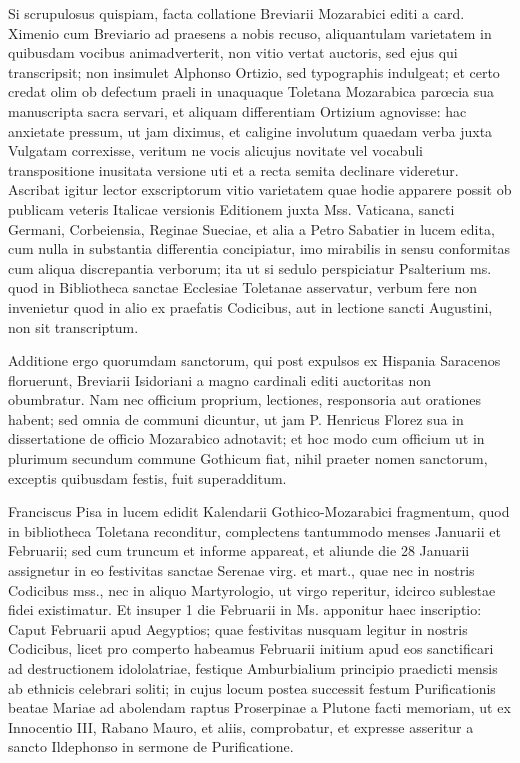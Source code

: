\documentclass[letter,11pt]{book}
\begin{document}
 Si scrupulosus quispiam, facta collatione Breviarii Mozarabici editi a card. Ximenio cum Breviario ad praesens a nobis recuso, aliquantulam varietatem in quibusdam vocibus animadverterit, non vitio vertat auctoris, sed ejus qui transcripsit; non insimulet Alphonso Ortizio, sed typographis indulgeat; et certo credat olim ob defectum praeli in unaquaque Toletana Mozarabica parœcia sua manuscripta sacra servari, et aliquam differentiam Ortizium agnovisse: hac anxietate pressum, ut jam diximus, et caligine involutum quaedam verba juxta Vulgatam correxisse, veritum ne vocis alicujus novitate vel vocabuli transpositione inusitata versione uti et a recta semita declinare videretur. Ascribat igitur lector exscriptorum vitio varietatem quae hodie apparere possit ob publicam veteris Italicae versionis Editionem juxta Mss. Vaticana, sancti Germani, Corbeiensia, Reginae Sueciae, et alia a Petro Sabatier in lucem edita, cum nulla in substantia differentia concipiatur, imo mirabilis in sensu conformitas cum aliqua discrepantia verborum; ita ut si sedulo perspiciatur Psalterium ms. quod in Bibliotheca sanctae Ecclesiae Toletanae asservatur, verbum fere non invenietur quod in alio ex praefatis Codicibus, aut in lectione sancti Augustini, non sit transcriptum.

Additione ergo quorumdam sanctorum, qui post expulsos ex Hispania Saracenos floruerunt, Breviarii Isidoriani a magno cardinali editi auctoritas non obumbratur. Nam nec officium proprium, lectiones, responsoria aut orationes habent; sed omnia de communi dicuntur, ut jam P. Henricus Florez sua in dissertatione de officio Mozarabico adnotavit; et hoc modo cum officium ut in plurimum secundum commune Gothicum fiat, nihil praeter nomen sanctorum, exceptis quibusdam festis, fuit superadditum.

Franciscus Pisa in lucem edidit Kalendarii Gothico-Mozarabici fragmentum, quod in bibliotheca Toletana reconditur, complectens tantummodo menses Januarii et Februarii; sed cum truncum et informe appareat, et aliunde die 28 Januarii assignetur in eo festivitas sanctae Serenae virg. et mart., quae nec in nostris Codicibus mss., nec in aliquo Martyrologio, ut virgo reperitur, idcirco sublestae fidei existimatur. Et insuper 1 die Februarii in Ms. apponitur haec inscriptio: Caput Februarii apud Aegyptios; quae festivitas nusquam legitur in nostris Codicibus, licet pro comperto habeamus Februarii initium apud eos sanctificari ad destructionem idololatriae, festique Amburbialium principio praedicti mensis ab ethnicis celebrari soliti; in cujus locum postea successit festum Purificationis beatae Mariae ad abolendam raptus Proserpinae a Plutone facti memoriam, ut ex Innocentio III, Rabano Mauro, et aliis, comprobatur, et expresse asseritur a sancto Ildephonso in sermone de Purificatione.
\end{document}
